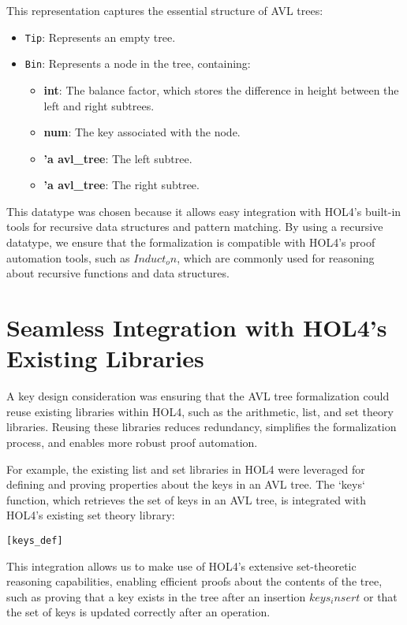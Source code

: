 This representation captures the essential structure of AVL trees:
\begin{itemize}
    \item \texttt{Tip}: Represents an empty tree.
    \item \texttt{Bin}: Represents a node in the tree, containing:
        \begin{itemize}
            \item \textbf{int}: The balance factor, which stores the difference in height between the left and right subtrees.
            \item \textbf{num}: The key associated with the node.
            \item \textbf{'a avl\_tree}: The left subtree.
            \item \textbf{'a avl\_tree}: The right subtree.
        \end{itemize}
\end{itemize}

This datatype was chosen because it allows easy integration with HOL4’s built-in tools for recursive data structures and pattern matching. By using a recursive datatype, we ensure that the formalization is compatible with HOL4's proof automation tools, such as  \( Induct_on \), which are commonly used for reasoning about recursive functions and data structures.

\section{Seamless Integration with HOL4’s Existing Libraries}

A key design consideration was ensuring that the AVL tree formalization could reuse existing libraries within HOL4, such as the arithmetic, list, and set theory libraries. Reusing these libraries reduces redundancy, simplifies the formalization process, and enables more robust proof automation.

For example, the existing list and set libraries in HOL4 were leveraged for defining and proving properties about the keys in an AVL tree. The `keys` function, which retrieves the set of keys in an AVL tree, is integrated with HOL4’s existing set theory library:

\begin{alltt}
	[keys_def]
\end{alltt}


This integration allows us to make use of HOL4’s extensive set-theoretic reasoning capabilities, enabling efficient proofs about the contents of the tree, such as proving that a key exists in the tree after an insertion \(keys_insert\) or that the set of keys is updated correctly after an operation.

